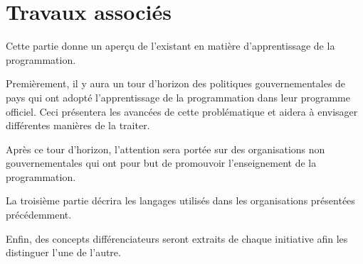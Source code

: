 \chapter{Travaux associés}
\label{travail associé}
Cette partie donne un aperçu de l'existant en matière d'apprentissage de la programmation.

Premièrement, il y aura un tour d'horizon des politiques gouvernementales de pays qui ont adopté l'apprentissage de la programmation dans leur programme officiel. Ceci présentera les avancées de cette problématique et aidera à envisager différentes manières de la traiter. 

Après ce tour d'horizon, l'attention sera portée sur des organisations non gouvernementales qui ont pour but de promouvoir l'enseignement de la programmation. 

La troisième partie décrira les langages utilisés dans les organisations présentées précédemment. 

Enfin, des concepts différenciateurs seront extraits de chaque initiative afin les distinguer l'une de l'autre.




